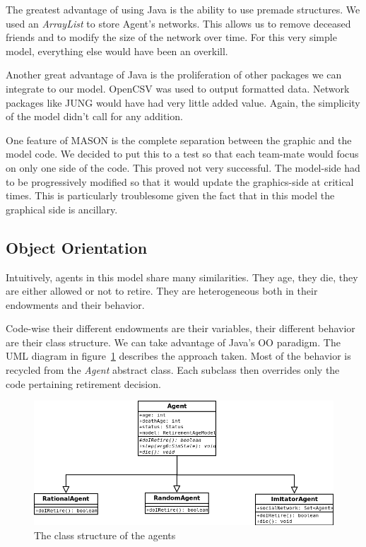 \documentclass[runningheads,a4paper]{article}
\begin{document}
The greatest advantage of using Java is the ability to use premade structures.
We used an \textit{ArrayList} to store Agent's networks.
This allows us to remove deceased friends and to modify the size of the network over time.
For this very simple model, everything else would have been an overkill.

Another great advantage of Java is the proliferation of other packages we can integrate to our model.
OpenCSV was used to output formatted data.
Network packages like JUNG would have had very little added value.
Again, the simplicity of the model didn't call for any addition.

One feature of MASON is the complete separation between the graphic and the model code.
We decided to put this to a test so that each team-mate would focus on only one side of the code.
This proved not very successful.
The model-side had to be progressively modified so that it would update the graphics-side at critical times.
This is particularly troublesome given the fact that in this model the graphical side is ancillary.

\subsection{Object Orientation}

Intuitively, agents in this model share many similarities.
They age, they die, they are either allowed or not to retire.
They are heterogeneous both in their endowments and their behavior.

Code-wise their different endowments are their variables, their different behavior are their class structure.
We can take advantage of Java's OO paradigm.
The UML diagram in figure~\ref{UML} describes the approach taken.
Most of the behavior is recycled from the \textit{Agent} abstract class.
Each subclass then overrides only the code pertaining retirement decision.

\begin{figure}
 \begin{center}
  \includegraphics[scale=.45]{figs/UML.png}
\caption{The class structure of the agents}
\label{UML}
 \end{center}
\end{figure}
\end{document}

